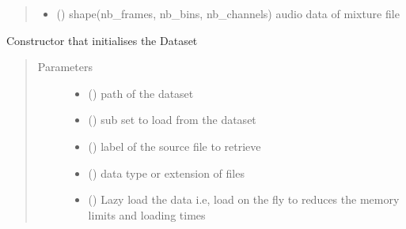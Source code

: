 \documentclass[letterpaper,10pt,english,openany,oneside]{sphinxmanual}
\begin{document}
\begin{fulllineitems}
\begin{fulllineitems}
\begin{quote}
\begin{description}
\begin{itemize}
\item {} 
 () \textendash{} shape(nb\_frames, nb\_bins, nb\_channels)
audio data of mixture file

\end{itemize}


\end{description}\end{quote}

\end{fulllineitems}


\begin{fulllineitems}
\label{\detokenize{docs/source/dataset:dataset.Dataset.__init__}}
Constructor that initialises the Dataset
\begin{quote}\begin{description}
\item[{Parameters}] \leavevmode\begin{itemize}
\item {} 
 () \textendash{} path of the dataset

\item {} 
 () \textendash{} sub set to load from the dataset

\item {} 
 () \textendash{} label of the source file to retrieve

\item {} 
 () \textendash{} data type or extension of files

\item {} 
 () \textendash{} Lazy load the data i.e, load on the fly to reduces the memory limits and loading times


\end{itemize}
\end{description}
\end{quote}
\end{fulllineitems}
\end{fulllineitems}
\end{document}
